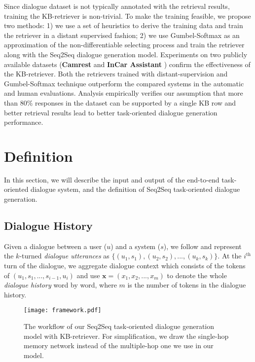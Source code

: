 \documentclass[11pt,a4paper]{article}
\begin{document}
Since dialogue dataset is not typically annotated with the retrieval results, 
training the KB-retriever is non-trivial.
To make the training feasible, we
propose two methods:
1) we use a set of heuristics to derive the training data
and train the retriever in a distant supervised fashion;
2) we use Gumbel-Softmax \cite{45822} 
as an approximation of the non-differentiable selecting process
and train the retriever along with 
the Seq2Seq dialogue generation model. 
Experiments on two publicly available datasets ({\bf{Camrest}} \cite{wen:2017:EACL} and {\bf{InCar Assistant}} \cite{eric:2017:SIGDial}) 
confirm
the effectiveness of the KB-retriever.
Both the retrievers
trained with distant-supervision and Gumbel-Softmax technique outperform
the compared systems
in the automatic and human evaluations. 
Analysis empirically verifies our assumption
that more than 80\% responses
in the dataset can be supported by a single KB row
and better retrieval results lead to better task-oriented dialogue generation performance.

\section{Definition}
In this section,
we will describe the input and output of the end-to-end task-oriented dialogue system,
and the definition of Seq2Seq task-oriented dialogue generation.

\subsection{Dialogue History}
Given a dialogue between a user ($u$) and a system ($s$),
we follow  and
represent the $k$-turned \textit{dialogue utterances} as 
$\{(u_{1}, s_{1} ), (u_{2} , s_{2} ), ... , (u_{k}, s_{k})\}$.
At the $i^{\text{th}}$ turn of the dialogue, we aggregate dialogue context
which consists of the tokens of $(u_{1}, s_{1}, ..., s_{i-1}, u_{i})$ and use $\mathbf{x} = (x_{1}, x_{2}, ..., x_{m})$ 
to denote the whole \textit{dialogue history} word by word,
where $m$ is the number of tokens in the dialogue history.
\begin{figure*}[t]
	\centering
\texttt{[image: framework.pdf]}
	\caption{
		The workflow of our Seq2Seq task-oriented dialogue generation model with KB-retriever.
		For simplification, we draw the single-hop memory network instead of the multiple-hop one we use in our model.
	}
	\label{fig:framework}
\end{figure*}
\end{document}
